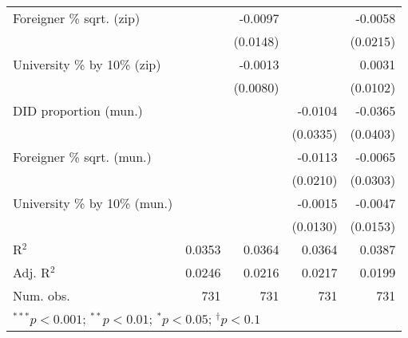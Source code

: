 \begin{tabular}{l D{.}{.}{3.6} D{.}{.}{3.6} D{.}{.}{3.6} D{.}{.}{3.6}}
Foreigner \% sqrt. (zip)          &             & -0.0097     &             & -0.0058     \\
                                  &             & (0.0148)    &             & (0.0215)    \\
University \% by 10\% (zip)       &             & -0.0013     &             & 0.0031      \\
                                  &             & (0.0080)    &             & (0.0102)    \\
DID proportion (mun.)             &             &             & -0.0104     & -0.0365     \\
                                  &             &             & (0.0335)    & (0.0403)    \\
Foreigner \% sqrt. (mun.)         &             &             & -0.0113     & -0.0065     \\
                                  &             &             & (0.0210)    & (0.0303)    \\
University \% by 10\% (mun.)      &             &             & -0.0015     & -0.0047     \\
                                  &             &             & (0.0130)    & (0.0153)    \\
\midrule
R$^2$                             & 0.0353      & 0.0364      & 0.0364      & 0.0387      \\
Adj. R$^2$                        & 0.0246      & 0.0216      & 0.0217      & 0.0199      \\
Num. obs.                         & 731         & 731         & 731         & 731         \\
\bottomrule
{}
\end{tabular}
